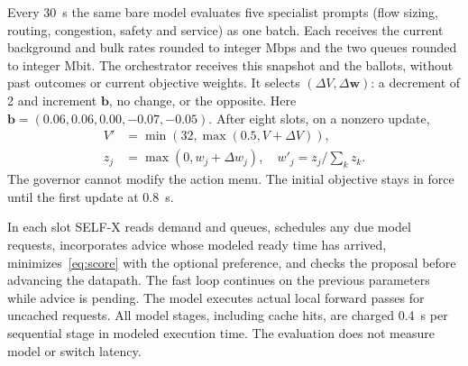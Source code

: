 \documentclass[conference]{IEEEtran}
\begin{document}
Every 30~s the same bare model evaluates five specialist prompts (flow sizing, routing, congestion, safety and service) as one batch. Each receives the current background and bulk rates rounded to integer Mbps and the two queues rounded to integer Mbit. The orchestrator receives this snapshot and the ballots, without past outcomes or current objective weights. It selects \((\Delta V,\Delta\mathbf{w})\): a decrement of 2 and increment \(\mathbf{b}\), no change, or the opposite. Here \(\mathbf{b}=(0.06,0.06,0.00,-0.07,-0.05)\). After eight slots, on a nonzero update,
\begin{align}
V'&=\min(32,\max(0.5,V+\Delta V)),\\
z_j&=\max(0,w_j+\Delta w_j),\quad w'_j=z_j/\sum_k z_k .
\end{align}
The governor cannot modify the action menu. The initial objective stays in force until the first update at 0.8~s.

In each slot SELF-X reads demand and queues, schedules any due model requests, incorporates advice whose modeled ready time has arrived, minimizes~\eqref{eq:score} with the optional preference, and checks the proposal before advancing the datapath. The fast loop continues on the previous parameters while advice is pending. The model executes actual local forward passes for uncached requests. All model stages, including cache hits, are charged 0.4~s per sequential stage in modeled execution time. The evaluation does not measure model or switch latency.
\end{document}

